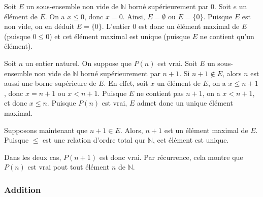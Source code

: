     Soit $E$ un sous-ensemble non vide de $\mathbb{N}$ borné supérieurement par $0$.
    Soit $e$ un élément de $E$. 
    On a $x \leq 0$, donc $x = 0$. 
    Ainsi, $E = \emptyset$ ou $E = \lbrace 0 \rbrace$.
    Puisque $E$ est non vide, on en déduit $E = \lbrace 0 \rbrace$. 
    L'entier $0$ est donc un élément maximal de $E$ (puisque $0 \leq 0$) et cet élément maximal est unique (puisque $E$ ne contient qu'un élément).

    Soit $n$ un entier naturel. 
    On suppose que $P(n)$ est vrai.
    Soit $E$ un sous-ensemble non vide de $\mathbb{N}$ borné supérieurement par $n+1$. 
    Si $n+1 \notin E$, alors $n$ est aussi une borne supérieure de $E$. 
    En effet, soit $x$ un élément de $E$, on a $x \leq n+1$, donc $x = n+1$ ou $x < n + 1$. 
    Puisque $E$ ne contient pas $n+1$, on a $x < n+1$, et donc $x \leq n$. 
    Puisque $P(n)$ est vrai, $E$ admet donc un unique élément maximal.

    Supposons maintenant que $n+1 \in E$. 
    Alors, $n+1$ est un élément maximal de $E$. 
    Puisque $\leq$ est une relation d'ordre total qur $\mathbb{N}$, cet élément est unique. 

    Dans les deux cas, $P(n+1)$ est donc vrai. 
    Par récurrence, cela montre que $P(n)$ est vrai pout tout élément $n$ de $\mathbb{N}$.

   \done 

\subsubsection{Addition}
\label{subsub:addition}

